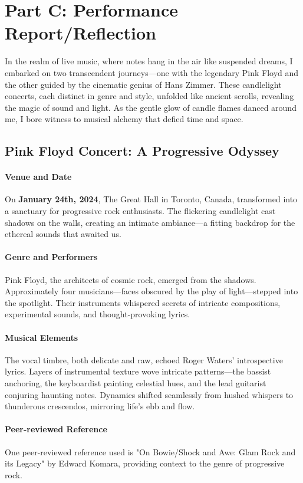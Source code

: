 \section{Part C: Performance Report/Reflection}

In the realm of live music, where notes hang in the air like suspended dreams, I embarked on two transcendent journeys—one with the legendary Pink Floyd and the other guided by the cinematic genius of Hans Zimmer. These candlelight concerts, each distinct in genre and style, unfolded like ancient scrolls, revealing the magic of sound and light. As the gentle glow of candle flames danced around me, I bore witness to musical alchemy that defied time and space.

\subsection{Pink Floyd Concert: A Progressive Odyssey}
\paragraph{Venue and Date}
On \textbf{January 24th, 2024}, The Great Hall in Toronto, Canada, transformed into a sanctuary for progressive rock enthusiasts. The flickering candlelight cast shadows on the walls, creating an intimate ambiance—a fitting backdrop for the ethereal sounds that awaited us.

\paragraph{Genre and Performers}
Pink Floyd, the architects of cosmic rock, emerged from the shadows. Approximately four musicians—faces obscured by the play of light—stepped into the spotlight. Their instruments whispered secrets of intricate compositions, experimental sounds, and thought-provoking lyrics.

\paragraph{Musical Elements}
The vocal timbre, both delicate and raw, echoed Roger Waters' introspective lyrics. Layers of instrumental texture wove intricate patterns—the bassist anchoring, the keyboardist painting celestial hues, and the lead guitarist conjuring haunting notes. Dynamics shifted seamlessly from hushed whispers to thunderous crescendos, mirroring life's ebb and flow.

\paragraph{Peer-reviewed Reference}
One peer-reviewed reference used is "On Bowie/Shock and Awe: Glam Rock and its Legacy" by Edward Komara\autocite{reynolds}, providing context to the genre of progressive rock.

